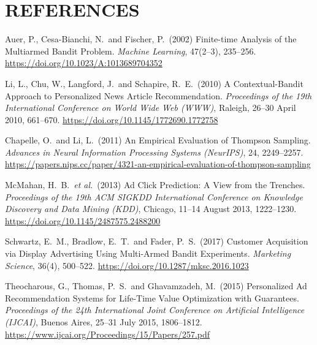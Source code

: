 \section{REFERENCES}

\begin{enumerate}[label={[\arabic*]},
                  leftmargin=2.8em,
                  labelwidth=2.4em,
                  labelsep=0.4em,
                  itemsep=6pt,
                  align=left]

\item Auer, P., Cesa-Bianchi, N.\ and Fischer, P.\ (2002) Finite-time Analysis of the Multiarmed Bandit Problem. \textit{Machine Learning}, 47(2--3), 235--256. \url{https://doi.org/10.1023/A:1013689704352}

\item Li, L., Chu, W., Langford, J.\ and Schapire, R.~E.\ (2010) A Contextual-Bandit Approach to Personalized News Article Recommendation. \textit{Proceedings of the 19th International Conference on World Wide Web (WWW)}, Raleigh, 26--30 April 2010, 661--670. \url{https://doi.org/10.1145/1772690.1772758}

\item Chapelle, O.\ and Li, L.\ (2011) An Empirical Evaluation of Thompson Sampling. \textit{Advances in Neural Information Processing Systems (NeurIPS)}, 24, 2249--2257. \url{https://papers.nips.cc/paper/4321-an-empirical-evaluation-of-thompson-sampling}

\item McMahan, H.~B.\ \textit{et al.}\ (2013) Ad Click Prediction: A View from the Trenches. \textit{Proceedings of the 19th ACM SIGKDD International Conference on Knowledge Discovery and Data Mining (KDD)}, Chicago, 11--14 August 2013, 1222--1230. \url{https://doi.org/10.1145/2487575.2488200}

\item Schwartz, E.~M., Bradlow, E.~T.\ and Fader, P.~S.\ (2017) Customer Acquisition via Display Advertising Using Multi-Armed Bandit Experiments. \textit{Marketing Science}, 36(4), 500--522. \url{https://doi.org/10.1287/mksc.2016.1023}

\item Theocharous, G., Thomas, P.~S.\ and Ghavamzadeh, M.\ (2015) Personalized Ad Recommendation Systems for Life-Time Value Optimization with Guarantees. \textit{Proceedings of the 24th International Joint Conference on Artificial Intelligence (IJCAI)}, Buenos Aires, 25--31 July 2015, 1806--1812. \url{https://www.ijcai.org/Proceedings/15/Papers/257.pdf}


\end{enumerate}
